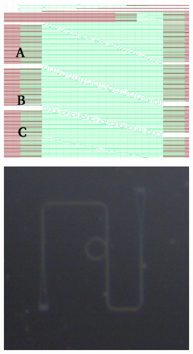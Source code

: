 
\begingroup
    \centering  
    \includegraphics[width=10cm]{img/method/glassgowChipNumbering.png}
     \vspace{3pt} \label{crossCompare1}
\endgroup

\begingroup
    \centering  
    \includegraphics[width=10cm]{img/method/chipPictures/exampleASIRing.png}
     \vspace{3pt} \label{crossCompare2}
\endgroup